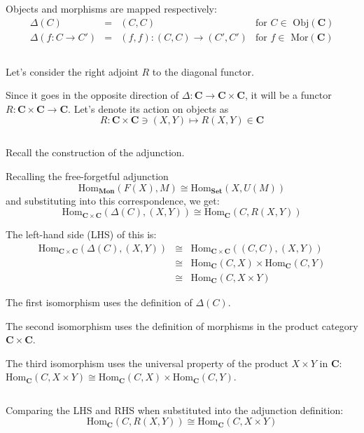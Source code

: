 \documentclass[uplatex,a4j,12pt,dvipdfmx]{jsarticle}
\begin{document}
Objects and morphisms are mapped respectively:
\[
	\begin{array}{rclr}
		\Delta(C)          & = & (C, C)                    & \text{for $C \in$ Obj}(\mathbf{C}) \\
		\Delta(f:C \to C') & = & (f,f) : (C,C) \to (C',C') & \text{for $f \in$ Mor}(\mathbf{C})
	\end{array}
\]

${}$

Let's consider the right adjoint $R$ to the diagonal functor.

Since it goes in the opposite direction of $\Delta : \mathbf{C} \to \mathbf{C} \times \mathbf{C}$,
it will be a functor $R : \mathbf{C} \times \mathbf{C} \to \mathbf{C}$.
Let's denote its action on objects as
$$
	R : \mathbf{C} \times \mathbf{C} \ni (X,Y) \mapsto R(X,Y) \in \mathbf{C}
$$

${}$

Recall the construction of the adjunction.

Recalling the free-forgetful adjunction
$$
	\mathrm{Hom}_{\mathbf{Mon}}(F(X), M) \cong \mathrm{Hom}_{\mathbf{Set}}(X, U(M))
$$
and substituting into this correspondence, we get:
$$
	\mathrm{Hom}_{\mathbf{C} \times \mathbf{C}}(\Delta(C), (X,Y)) \cong \mathrm{Hom}_{\mathbf{C}}(C, R(X,Y))
$$

The left-hand side (LHS) of this is:
\[
	\begin{array}{rcl}
		\mathrm{Hom}_{\mathbf{C} \times \mathbf{C}}(\Delta(C), (X,Y))
		 & \cong &
		\mathrm{Hom}_{\mathbf{C} \times \mathbf{C}}((C,C), (X,Y))
		\\ &\cong&
		\mathrm{Hom}_{\mathbf{C}}(C, X)
		\times
		\mathrm{Hom}_{\mathbf{C}}(C, Y)
		\\ &\cong&
		\mathrm{Hom}_{\mathbf{C}}(C, X \times Y)
	\end{array}
\]

The first isomorphism uses the definition of $\Delta(C)$.

The second isomorphism uses the definition of morphisms in the product category $\mathbf{C} \times \mathbf{C}$.

The third isomorphism uses the universal property of the product $X \times Y$ in $\mathbf{C}$:
$\mathrm{Hom}_{\mathbf{C}}(C, X \times Y) \cong \mathrm{Hom}_{\mathbf{C}}(C, X) \times \mathrm{Hom}_{\mathbf{C}}(C, Y)$.

${}$

Comparing the LHS and RHS when substituted into the adjunction definition:
$$
	\mathrm{Hom}_{\mathbf{C}}(C, R(X,Y))
	\cong
	\mathrm{Hom}_{\mathbf{C}}(C, X \times Y)
$$
\end{document}
